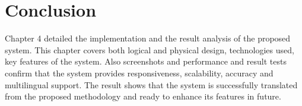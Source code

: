 \section{Conclusion}
Chapter 4 detailed the implementation and the result analysis of the proposed system. This chapter covers both logical and physical design, technologies used, key features of the system. Also screenshots and performance and result tests confirm that the system provides responsiveness, scalability, accuracy and multilingual support. The result shows that the system is successfully translated from the proposed methodology and ready to enhance its features in future.






